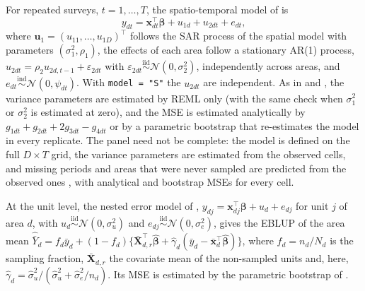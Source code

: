 For repeated surveys, \(t = 1, \dots, T\), the spatio-temporal model of \citet{marhuenda2013small} is
\begin{equation}
y_{dt} = \boldsymbol{x}_{dt}^\top\boldsymbol{\beta} + u_{1d} + u_{2dt} + e_{dt},
\label{eq:stfh}
\end{equation}
where \(\boldsymbol{u}_1 = (u_{11}, \dots, u_{1D})^\top\) follows the SAR process of the spatial model with parameters \((\sigma_1^2, \rho_1)\), the effects of each area follow a stationary AR(1) process, \(u_{2dt} = \rho_2 u_{2d,t-1} + \varepsilon_{2dt}\) with \(\varepsilon_{2dt} \overset{\mathrm{iid}}{\sim} \mathcal{N}(0, \sigma_2^2)\), independently across areas, and \(e_{dt} \overset{\mathrm{ind}}{\sim} \mathcal{N}(0, \psi_{dt})\). With \texttt{model\ =\ "S"} the \(u_{2dt}\) are independent. As in \citet{marhuenda2013small} and , the variance parameters are estimated by REML only (with the same check when \(\sigma_1^2\) or \(\sigma_2^2\) is estimated at zero), and the MSE is estimated analytically by \(g_{1dt} + g_{2dt} + 2g_{3dt} - g_{4dt}\) or by a parametric bootstrap that re-estimates the model in every replicate. The panel need not be complete: the model is defined on the full \(D \times T\) grid, the variance parameters are estimated from the observed cells, and missing periods and areas that were never sampled are predicted from the observed ones \citep{saei2005out}, with analytical and bootstrap MSEs for every cell.

At the unit level, the nested error model of \citet{battese1988error}, \(y_{dj} = \boldsymbol{x}_{dj}^\top\boldsymbol{\beta} + u_d + e_{dj}\) for unit \(j\) of area \(d\), with \(u_d \overset{\mathrm{iid}}{\sim} \mathcal{N}(0, \sigma_u^2)\) and \(e_{dj} \overset{\mathrm{iid}}{\sim} \mathcal{N}(0, \sigma_e^2)\), gives the EBLUP of the area mean \(\hat{\bar{Y}}_d = f_d\bar{y}_d + (1 - f_d)\{\bar{\boldsymbol{X}}_{d,r}^\top\hat{\boldsymbol{\beta}} + \hat{\gamma}_d(\bar{y}_d - \bar{\boldsymbol{x}}_d^\top\hat{\boldsymbol{\beta}})\}\), where \(f_d = n_d/N_d\) is the sampling fraction, \(\bar{\boldsymbol{X}}_{d,r}\) the covariate mean of the non-sampled units and, here, \(\hat{\gamma}_d = \hat{\sigma}_u^2/(\hat{\sigma}_u^2 + \hat{\sigma}_e^2/n_d)\). Its MSE is estimated by the parametric bootstrap of \citet{gonzalez2008bootstrap}.

